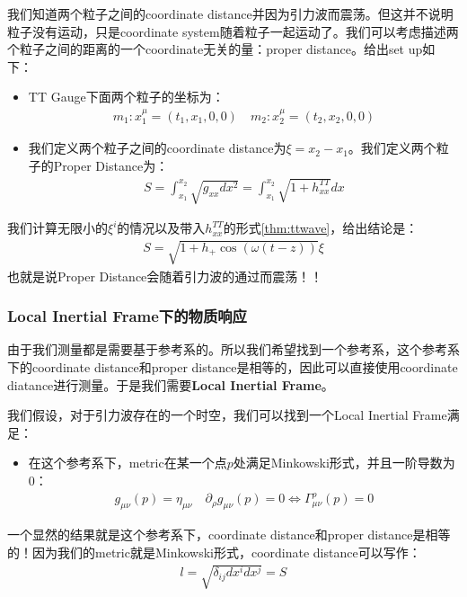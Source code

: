 \bigskip
{}

我们知道两个粒子之间的coordinate distance并因为引力波而震荡。但这并不说明粒子没有运动，只是coordinate system随着粒子一起运动了。我们可以考虑描述两个粒子之间的距离的一个coordinate无关的量：proper distance。给出set up如下：
\begin{itemize}
  \item TT Gauge下面两个粒子的坐标为：
    \begin{align}
      m_1 : x^{\mu}_1 = (t_1,x_1,0,0) \quad m_2 : x^{\mu}_2 = (t_2,x_2,0,0)
    \end{align}
  \item   我们定义两个粒子之间的coordinate distance为$ \xi = x_2 - x_1 $。我们定义两个粒子的Proper Distance为：
    \begin{align}
      S = \int_{x_1}^{x_2} \sqrt{g_{xx}dx^2} = \int_{x_1}^{x_2} \sqrt{1 + h_{xx}^{TT}} dx 
    \end{align}
\end{itemize}

我们计算无限小的$ \xi^i $的情况以及带入$ h_{xx}^{TT} $的形式\cref{thm:ttwave}，给出结论是：
\begin{align}
  S = \sqrt{1+ h_+ \cos (\omega(t-z))} \xi
\end{align}
也就是说Proper Distance会随着引力波的通过而震荡！！

\subsubsection{Local Inertial Frame下的物质响应}

由于我们测量都是需要基于参考系的。所以我们希望找到一个参考系，这个参考系下的coordinate distance和proper distance是相等的，因此可以直接使用coordinate diatance进行测量。于是我们需要\textbf{Local Inertial Frame}。

\bigskip
{}


我们假设，对于引力波存在的一个时空，我们可以找到一个Local Inertial Frame满足：
\begin{itemize}
  \item 在这个参考系下，metric在某一个点$ p $处满足Minkowski形式，并且一阶导数为0：
    \begin{align}
      g_{\mu\nu}(p) = \eta_{\mu\nu} \quad \partial_\rho g_{\mu\nu}(p) = 0 \Leftrightarrow \Gamma_{\mu\nu}^\rho(p) = 0
    \end{align}
\end{itemize}
一个显然的结果就是这个参考系下，coordinate distance和proper distance是相等的！因为我们的metric就是Minkowski形式，coordinate distance可以写作：
\begin{align}
  l = \sqrt{\delta_{ij} dx^i dx^j} = S
\end{align}


